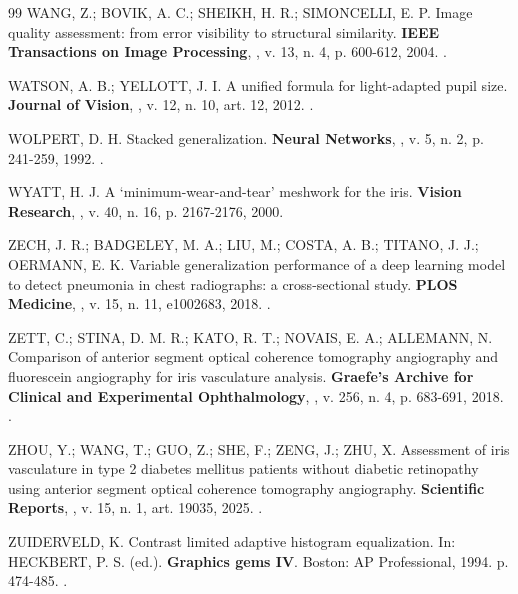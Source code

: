 \begin{thebibliography}{99}
WANG, Z.; BOVIK, A. C.; SHEIKH, H. R.; SIMONCELLI, E. P. Image quality
assessment: from error visibility to structural similarity. \textbf{IEEE
Transactions on Image Processing}, \semlocal, v. 13, n. 4, p. 600-612, 2004.
.

WATSON, A. B.; YELLOTT, J. I. A unified formula for light-adapted pupil size.
\textbf{Journal of Vision}, \semlocal, v. 12, n. 10, art. 12, 2012.
.

WOLPERT, D. H. Stacked generalization. \textbf{Neural Networks}, \semlocal,
v. 5, n. 2, p. 241-259, 1992. .

WYATT, H. J. A `minimum-wear-and-tear' meshwork for the iris. \textbf{Vision
Research}, \semlocal, v. 40, n. 16, p. 2167-2176, 2000.

ZECH, J. R.; BADGELEY, M. A.; LIU, M.; COSTA, A. B.; TITANO, J. J.;
OERMANN, E. K. Variable generalization performance of a deep learning model
to detect pneumonia in chest radiographs: a cross-sectional study.
\textbf{PLOS Medicine}, \semlocal, v. 15, n. 11, e1002683, 2018.
.

ZETT, C.; STINA, D. M. R.; KATO, R. T.; NOVAIS, E. A.; ALLEMANN, N.
Comparison of anterior segment optical coherence tomography angiography and
fluorescein angiography for iris vasculature analysis. \textbf{Graefe's
Archive for Clinical and Experimental Ophthalmology}, \semlocal, v. 256,
n. 4, p. 683-691, 2018. .

ZHOU, Y.; WANG, T.; GUO, Z.; SHE, F.; ZENG, J.; ZHU, X. Assessment of iris
vasculature in type 2 diabetes mellitus patients without diabetic retinopathy
using anterior segment optical coherence tomography angiography.
\textbf{Scientific Reports}, \semlocal, v. 15, n. 1, art. 19035, 2025.
.

ZUIDERVELD, K. Contrast limited adaptive histogram equalization. In:
HECKBERT, P. S. (ed.). \textbf{Graphics gems IV}. Boston: AP Professional,
1994. p. 474-485. .

\end{thebibliography}
